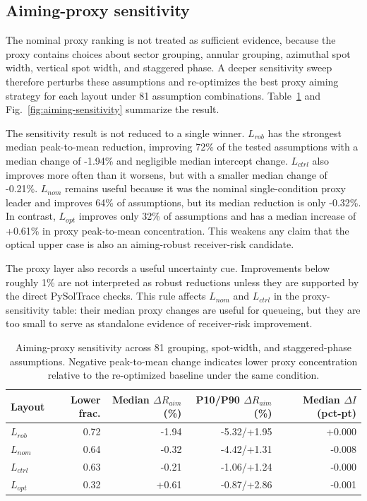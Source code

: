 \documentclass[final,3p,times]{elsarticle}
\begin{document}
\subsection{Aiming-proxy sensitivity}
The nominal proxy ranking is not treated as sufficient evidence, because the proxy contains choices about sector grouping, annular grouping, azimuthal spot width, vertical spot width, and staggered phase. A deeper sensitivity sweep therefore perturbs these assumptions and re-optimizes the best proxy aiming strategy for each layout under 81 assumption combinations. Table~\ref{tab:aiming-sensitivity} and Fig.~\ref{fig:aiming-sensitivity} summarize the result.

The sensitivity result is not reduced to a single winner. $L_{rob}$ has the strongest median peak-to-mean reduction, improving 72\% of the tested assumptions with a median change of -1.94\% and negligible median intercept change. $L_{ctrl}$ also improves more often than it worsens, but with a smaller median change of -0.21\%. $L_{nom}$ remains useful because it was the nominal single-condition proxy leader and improves 64\% of assumptions, but its median reduction is only -0.32\%. In contrast, $L_{opt}$ improves only 32\% of assumptions and has a median increase of +0.61\% in proxy peak-to-mean concentration. This weakens any claim that the optical upper case is also an aiming-robust receiver-risk candidate.

The proxy layer also records a useful uncertainty cue. Improvements below roughly 1\% are not interpreted as robust reductions unless they are supported by the direct PySolTrace checks. This rule affects $L_{nom}$ and $L_{ctrl}$ in the proxy-sensitivity table: their median proxy changes are useful for queueing, but they are too small to serve as standalone evidence of receiver-risk improvement.

\begin{table}[t]
\centering
\caption{Aiming-proxy sensitivity across 81 grouping, spot-width, and staggered-phase assumptions. Negative peak-to-mean change indicates lower proxy concentration relative to the re-optimized baseline under the same condition.}
\label{tab:aiming-sensitivity}
\scriptsize
\begin{tabular*}{\textwidth}{@{\extracolsep{\fill}}lrrrr@{}}
\toprule
Layout & Lower frac. & Median $\Delta R_{aim}$ (\%) & P10/P90 $\Delta R_{aim}$ (\%) & Median $\Delta I$ (pct-pt) \\
\midrule
$L_{rob}$ & 0.72 & -1.94 & -5.32/+1.95 & +0.000 \\
$L_{nom}$ & 0.64 & -0.32 & -4.42/+1.31 & -0.008 \\
$L_{ctrl}$ & 0.63 & -0.21 & -1.06/+1.24 & -0.000 \\
$L_{opt}$ & 0.32 & +0.61 & -0.87/+2.86 & -0.001 \\
\bottomrule
\end{tabular*}
\end{table}
\end{document}
